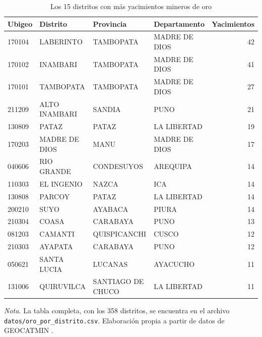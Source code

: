 \documentclass[man,12pt,a4paper,floatsintext,donotrepeattitle]{apa7}
\newcommand{\interlineadosencillo}{\renewcommand{\baselinestretch}{1}\selectfont}
\begin{document}
\begin{table}[htbp]
\caption{Los 15 distritos con más yacimientos mineros de oro}
\label{tab:distritos}
\centering
\interlineadosencillo
\begin{threeparttable}
\small
\begin{tabular}{@{}llllr@{}}
\toprule
Ubigeo & Distrito & Provincia & Departamento & Yacimientos \\
\midrule
170104 & LABERINTO     & TAMBOPATA         & MADRE DE DIOS & 42 \\
170102 & INAMBARI      & TAMBOPATA         & MADRE DE DIOS & 41 \\
170101 & TAMBOPATA     & TAMBOPATA         & MADRE DE DIOS & 27 \\
211209 & ALTO INAMBARI & SANDIA            & PUNO          & 21 \\
130809 & PATAZ         & PATAZ             & LA LIBERTAD   & 19 \\
170203 & MADRE DE DIOS & MANU              & MADRE DE DIOS & 17 \\
040606 & RIO GRANDE    & CONDESUYOS        & AREQUIPA      & 14 \\
110303 & EL INGENIO    & NAZCA             & ICA           & 14 \\
130808 & PARCOY        & PATAZ             & LA LIBERTAD   & 14 \\
200210 & SUYO          & AYABACA           & PIURA         & 14 \\
210304 & COASA         & CARABAYA          & PUNO          & 13 \\
081203 & CAMANTI       & QUISPICANCHI      & CUSCO         & 12 \\
210303 & AYAPATA       & CARABAYA          & PUNO          & 12 \\
050621 & SANTA LUCIA   & LUCANAS           & AYACUCHO      & 11 \\
131006 & QUIRUVILCA    & SANTIAGO DE CHUCO & LA LIBERTAD   & 11 \\
\bottomrule
\end{tabular}
\vspace{6pt}
\begin{tablenotes}[flushleft]
\small
\item \textit{Nota.} La tabla completa, con los 358 distritos, se encuentra en
el archivo \texttt{datos/oro\_por\_distrito.csv}.
Elaboración propia a partir de datos de GEOCATMIN \parencite{ingemmet2026}.
\end{tablenotes}
\end{threeparttable}
\end{table}
\end{document}
